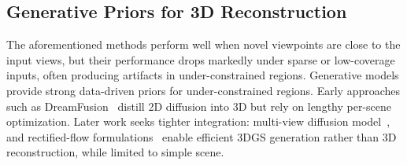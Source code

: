 

\subsection{Generative Priors for 3D Reconstruction}
The aforementioned methods perform well when novel viewpoints are close to the input views, but their performance drops markedly under sparse or low-coverage inputs, often producing artifacts in under-constrained regions. Generative models provide strong data-driven priors for under-constrained regions. Early approaches such as DreamFusion~\cite{poole2022dreamfusion} distill 2D diffusion into 3D but rely on lengthy per-scene optimization. Later work seeks tighter integration: multi-view diffusion model~\cite{szymanowicz2025bolt3d}, and rectified-flow formulations~\cite{wang2024splatflow} enable efficient 3DGS generation rather than 3D reconstruction, while limited to simple scene.

